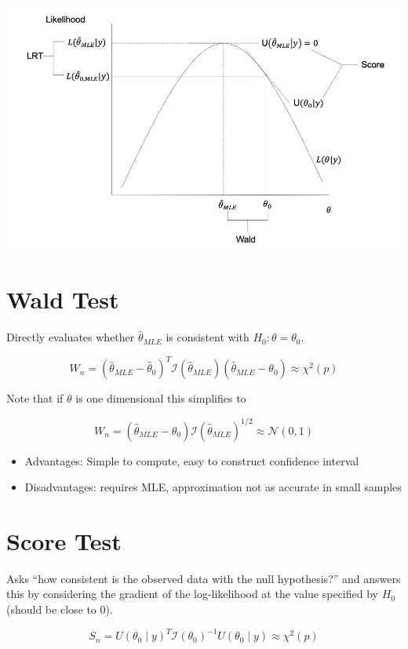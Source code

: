 \documentclass[
  letterpaper,
  DIV=11,
  numbers=noendperiod]{scrreport}
\providecommand{\tightlist}{%
  \setlength{\itemsep}{0pt}\setlength{\parskip}{0pt}}\usepackage{longtable,booktabs,array}
\begin{document}
\includegraphics{week10/images/asymptotic_tests.png}

\hypertarget{wald-test}{%
\section{Wald Test}\label{wald-test}}

Directly evaluates whether \(\hat \theta_{MLE}\) is consistent with
\(H_0 : \theta = \theta_0\).

\[W_n = (\hat \theta_{MLE} - \hat \theta_0)^T \mathcal I(\hat \theta_{MLE}) (\hat \theta_{MLE} - \theta_0) \approx \chi^2(p)\]

Note that if \(\theta\) is one dimensional this simplifies to

\[W_n = (\hat \theta_{MLE} - \theta_0) \mathcal I(\hat \theta_{MLE})^{1/2} \approx \mathcal N(0,1)\]

\begin{itemize}
\tightlist
\item
  Advantages: Simple to compute, easy to construct confidence interval
\item
  Disadvantages: requires MLE, approximation not as accurate in small
  samples
\end{itemize}

\hypertarget{score-test}{%
\section{Score Test}\label{score-test}}

Asks ``how consistent is the observed data with the null hypothesis?''
and answers this by considering the gradient of the log-likelihood at
the value specified by \(H_0\) (should be close to 0).

\[S_n = U(\theta_0 \mid y)^{T} \mathcal I(\theta_0)^{-1} U(\theta_0 \mid y) \approx \chi^2(p)\]
\end{document}

